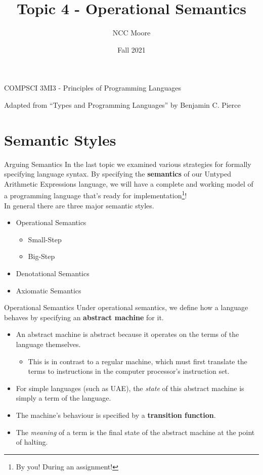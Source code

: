 \documentclass[11pt]{beamer}
\author{NCC Moore}
\title{Topic 4 - Operational Semantics}
\institute{McMaster University}
\date{Fall 2021}
\begin{document}
\begin{frame}
\center
COMPSCI 3MI3 - Principles of Programming Languages
\titlepage

Adapted from ``Types and Programming Languages'' by Benjamin C. Pierce 
\end{frame}

\begin{frame}
\tableofcontents
\end{frame}

\section[Styles]{Semantic Styles}
\begin{frame}[fragile=singleslide]{Arguing Semantics}
In the last topic we examined various strategies for formally specifying language syntax.  By specifying the \textbf{semantics} of our Untyped Arithmetic Expressions language, we will have a complete and working model of a programming language that's ready for implementation\footnote{By you! During an assignment!}! \\
\vspace{1em}
In general there are three major semantic styles.  
\begin{itemize}
\item Operational Semantics
\begin{itemize}
\item Small-Step 
\item Big-Step 
\end{itemize}
\item Denotational Semantics
\item Axiomatic Semantics 
\end{itemize}
\end{frame}

\begin{frame}[fragile=singleslide]{Operational Semantics}
Under operational semantics, we define how a language behaves by specifying an \textbf{abstract machine} for it.  
\begin{itemize}
\item An abstract machine is abstract because it operates on the terms of the language themselves.
\begin{itemize}
\item This is in contrast to a regular machine, which must first translate the terms to instructions in the computer processor's instruction set.  
\end{itemize}
\item For simple languages (such as UAE), the \emph{state} of this abstract machine is simply a term of the language.
\item The machine's behaviour is specified by a \textbf{transition function}. 
\item The \emph{meaning} of a term is the final state of the abstract machine at the point of halting.    
\end{itemize}
\end{frame}
\end{document}
